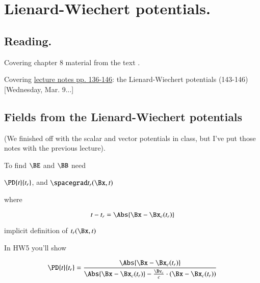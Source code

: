 %
%

\chapter{Lienard-Wiechert potentials.}
\label{chap:relativisticElectrodynamicsL19}
{}
\date{Mar 15, 2011}

\beginArtNoToc

\section{Reading.}

Covering chapter 8 material from the text \cite{landau1980classical}.

Covering \href{http://www.physics.utoronto.ca/~poppitz/epoppitz/PHY450_files/RelEMpp136-146.pdf}{lecture notes pp. 136-146}: the Lienard-Wiechert potentials (143-146) [Wednesday, Mar. 9...]

\section{Fields from the Lienard-Wiechert potentials}

(We finished off with the scalar and vector potentials in class, but I've put those notes with the previous lecture).

To find $\BE$ and $\BB$ need 

$\PD{t}{t_r}$, and $\spacegrad t_r(\Bx, t)$

where 

\begin{equation}\label{eqn:relativisticElectrodynamicsL19:10}
t - t_r = \Abs{\Bx - \Bx_c(t_r) }
\end{equation}

implicit definition of $t_r(\Bx, t)$

In HW5 you'll show

\begin{equation}\label{eqn:relativisticElectrodynamicsL19:30}
\PD{t}{t_r} = \frac{\Abs{\Bx - \Bx_c(t_r) }}{
\Abs{\Bx - \Bx_c(t_r) } - \frac{\Bv_c }{c} \cdot (\Bx - \Bx_c(t_r))}
\end{equation}

